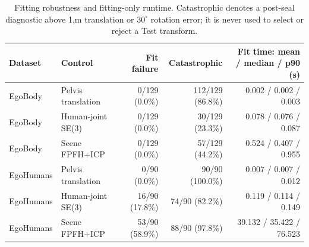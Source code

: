 \begin{table}[t]
  \centering
  \caption{Fitting robustness and fitting-only runtime. Catastrophic denotes
  a post-seal diagnostic above 1,m translation or $30^\circ$ rotation error;
  it is never used to select or reject a Test transform.}
  \label{tab:supp-registration-failures}
  \supptablesize
  \setlength{\tabcolsep}{2.5pt}
  \begin{tabular}{llrrr}
    \toprule
    Dataset & Control & Fit failure & Catastrophic & Fit time: mean / median / p90 (s) \\
    \midrule
    EgoBody & Pelvis translation & 0/129 (0.0\%) & 112/129 (86.8\%) & 0.002 / 0.002 / 0.003 \\
    EgoBody & Human-joint SE(3) & 0/129 (0.0\%) & 30/129 (23.3\%) & 0.078 / 0.076 / 0.087 \\
    EgoBody & Scene FPFH+ICP & 0/129 (0.0\%) & 57/129 (44.2\%) & 0.524 / 0.407 / 0.955 \\
    \midrule
    EgoHumans & Pelvis translation & 0/90 (0.0\%) & 90/90 (100.0\%) & 0.007 / 0.007 / 0.012 \\
    EgoHumans & Human-joint SE(3) & 16/90 (17.8\%) & 74/90 (82.2\%) & 0.119 / 0.114 / 0.149 \\
    EgoHumans & Scene FPFH+ICP & 53/90 (58.9\%) & 88/90 (97.8\%) & 39.132 / 35.422 / 76.523 \\
    \bottomrule
  \end{tabular}
\end{table}
